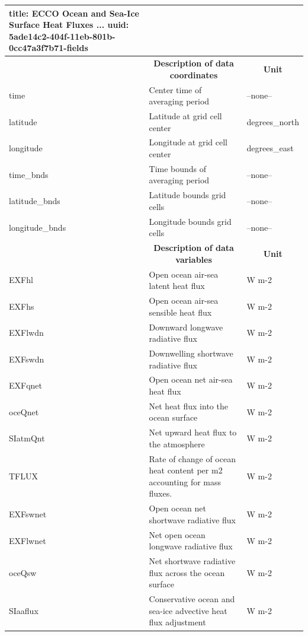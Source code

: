 \begin{longtable}{|m{}|m{}|m{}|}
{    title:                        ECCO Ocean and Sea-Ice Surface Heat Fluxes ...
    uuid:                         5ade14c2-404f-11eb-801b-0cc47a3f7b71-fields} \\ 
\hline \endhead \hline \endfoot
\rowcolor{lightgray} \multicolumn{1}{|c|}{\textbf{Coordinates}} & \multicolumn{1}{|c|}{\textbf{Description of data coordinates}} &  \multicolumn{1}{|c|}{\textbf{Unit}}\\ \hline
time &Center time of averaging period &--none--  \\ \hline
latitude &Latitude at grid cell center &degrees\_north  \\ \hline
longitude &Longitude at grid cell center &degrees\_east  \\ \hline
time\_bnds &Time bounds of averaging period &--none--  \\ \hline
latitude\_bnds &Latitude bounds grid cells &--none--  \\ \hline
longitude\_bnds &Longitude bounds grid cells &--none--  \\ \hline
\rowcolor{lightgray} \multicolumn{1}{|c|}{\textbf{Variables}} & \multicolumn{1}{|c|}{\textbf{Description of data variables}} &  \multicolumn{1}{|c|}{\textbf{Unit}}\\ \hline
EXFhl &Open ocean air-sea latent heat flux &W m-2  \\ \hline
EXFhs &Open ocean air-sea sensible heat flux &W m-2  \\ \hline
EXFlwdn &Downward longwave radiative flux &W m-2  \\ \hline
EXFswdn &Downwelling shortwave radiative flux &W m-2  \\ \hline
EXFqnet &Open ocean net air-sea heat flux &W m-2  \\ \hline
oceQnet &Net heat flux into the ocean surface &W m-2  \\ \hline
SIatmQnt &Net upward heat flux to the atmosphere &W m-2  \\ \hline
TFLUX &Rate of change of ocean heat content per m2 accounting for mass fluxes. &W m-2  \\ \hline
EXFswnet &Open ocean net shortwave radiative flux &W m-2  \\ \hline
EXFlwnet &Net open ocean longwave radiative flux &W m-2  \\ \hline
oceQsw &Net shortwave radiative flux across the ocean surface &W m-2  \\ \hline
SIaaflux &Conservative ocean and sea-ice advective heat flux adjustment &W m-2  \\ \hline
\end{longtable}

